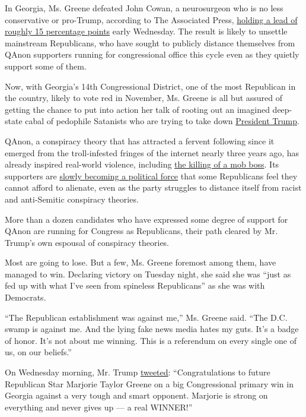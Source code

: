 In Georgia, Ms. Greene defeated John Cowan, a neurosurgeon who is no
less conservative or pro-Trump, according to The Associated Press,
\href{https://www.nytimes3xbfgragh.onion/interactive/2020/08/11/us/elections/results-georgia-house-district-14-republican-primary-runoff-election.html}{holding
a lead of roughly 15 percentage points} early Wednesday. The result is
likely to unsettle mainstream Republicans, who have sought to publicly
distance themselves from QAnon supporters running for congressional
office this cycle even as they quietly support some of them.

Now, with Georgia's 14th Congressional District, one of the most
Republican in the country, likely to vote red in November, Ms. Greene is
all but assured of getting the chance to put into action her talk of
rooting out an imagined deep-state cabal of pedophile Satanists who are
trying to take down
\href{https://www.nytimes3xbfgragh.onion/interactive/2020/us/elections/donald-trump.html}{President
Trump}.

QAnon, a conspiracy theory that has attracted a fervent following since
it emerged from the troll-infested fringes of the internet nearly three
years ago, has already inspired real-world violence, including
\href{https://www.nytimes3xbfgragh.onion/2019/07/21/nyregion/gambino-shooting-anthony-comello-frank-cali.html}{the
killing of a mob boss}. Its supporters are
\href{https://www.nytimes3xbfgragh.onion/2020/07/14/us/politics/qanon-politicians-candidates.html}{slowly
becoming a political force} that some Republicans feel they cannot
afford to alienate, even as the party struggles to distance itself from
racist and anti-Semitic conspiracy theories.

More than a dozen candidates who have expressed some degree of support
for QAnon are running for Congress as Republicans, their path cleared by
Mr. Trump's own espousal of conspiracy theories.

Most are going to lose. But a few, Ms. Greene foremost among them, have
managed to win. Declaring victory on Tuesday night, she said she was
``just as fed up with what I've seen from spineless Republicans'' as she
was with Democrats.

``The Republican establishment was against me,'' Ms. Greene said. ``The
D.C. swamp is against me. And the lying fake news media hates my guts.
It's a badge of honor. It's not about me winning. This is a referendum
on every single one of us, on our beliefs.''

On Wednesday morning, Mr. Trump
\href{https://twitter.com/realDonaldTrump/status/1293525010523578375?s=20}{tweeted}:
``Congratulations to future Republican Star Marjorie Taylor Greene on a
big Congressional primary win in Georgia against a very tough and smart
opponent. Marjorie is strong on everything and never gives up --- a real
WINNER!''


